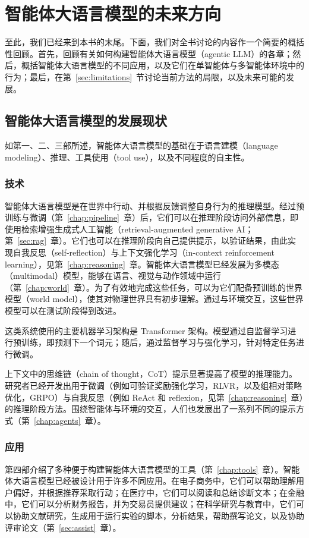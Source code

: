 \chapter{智能体大语言模型的未来方向}\label{chap:concl}


至此，我们已经来到本书的末尾。下面，我们对全书讨论的内容作一个简要的概括性回顾。首先，回顾有关如何构建智能体大语言模型（agentic LLM）的各章；然后，概括智能体大语言模型的不同应用，以及它们在单智能体与多智能体环境中的行为；最后，在第~\ref{sec:limitations}~节讨论当前方法的局限，以及未来可能的发展。

\section{智能体大语言模型的发展现状}
如第一、二、三部所述，智能体大语言模型的基础在于语言建模（language modeling）、推理、工具使用（tool use），以及不同程度的自主性。

\subsection{技术}
智能体大语言模型是在世界中行动、并根据反馈调整自身行为的推理模型。经过预训练与微调（第~\ref{chap:pipeline}~章）后，它们可以在推理阶段访问外部信息，即使用检索增强生成式人工智能（retrieval-augmented generative AI；第~\ref{sec:rag}~章）。它们也可以在推理阶段向自己提供提示，以验证结果，由此实现自我反思（self-reflection）与上下文强化学习（in-context reinforcement learning），见第~\ref{chap:reasoning}~章。智能体大语言模型已经发展为多模态（multimodal）模型，能够在语言、视觉与动作领域中运行（第~\ref{chap:world}~章）。为了有效地完成这些任务，可以为它们配备预训练的世界模型（world model），使其对物理世界具有初步理解。通过与环境交互，这些世界模型可以在测试阶段得到改进。

这类系统使用的主要机器学习架构是 Transformer 架构。模型通过自监督学习进行预训练，即预测下一个词元；随后，通过监督学习与强化学习，针对特定任务进行微调。

上下文中的思维链（chain of thought，CoT）提示显著提高了模型的推理能力。研究者已经开发出用于微调（例如可验证奖励强化学习，RLVR，以及组相对策略优化，GRPO）与自我反思（例如 ReAct 和 reflexion，见第~\ref{chap:reasoning}~章）的推理阶段方法。围绕智能体与环境的交互，人们也发展出了一系列不同的提示方式（第~\ref{chap:agents}~章）。

\subsection{应用}
第四部介绍了多种便于构建智能体大语言模型的工具（第~\ref{chap:tools}~章）。智能体大语言模型已经被设计用于许多不同应用。在电子商务中，它们可以帮助理解用户偏好，并根据推荐采取行动；在医疗中，它们可以阅读和总结诊断文本；在金融中，它们可以分析财务报告，并为交易员提供建议；在科学研究与教育中，它们可以协助文献研究，生成用于运行实验的脚本，分析结果，帮助撰写论文，以及协助评审论文（第~\ref{sec:assist}~章）。

